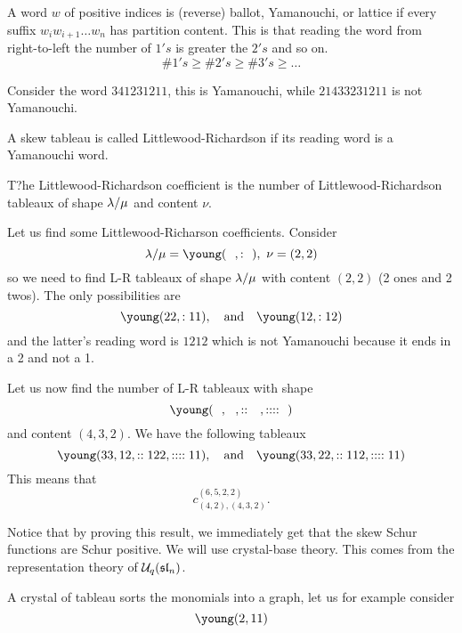 \documentclass[12pt]{memoir}
\begin{document}
\begin{Def}
    A word $w$ of positive indices is (reverse) ballot, Yamanouchi, or lattice if every suffix $w_iw_{i+1}\dots w_n$ has partition content. This is that reading the word from right-to-left the number of $1's$ is greater the $2's$ and so on. 
    $$\#1's\geq\#2's\geq\#3's\geq\dots$$
\end{Def}

\begin{Ex}
    Consider the word $341231211$, this is Yamanouchi, while $21433231211$ is not Yamanouchi.
\end{Ex}

\begin{Def}
    A skew tableau is called Littlewood-Richardson if its reading word is a Yamanouchi word.
\end{Def}

\begin{Th}
    T?he Littlewood-Richardson coefficient is the number of Littlewood-Richardson tableaux of shape $\lambda/\mu$ and content $\nu$.
\end{Th}

\begin{Ex}
    Let us find some Littlewood-Richarson coefficients. Consider 
    $$\la/\mu=\young(~~,:~~),\ \nu=(2,2)$$
    so we need to find L-R tableaux of shape $\lambda/\mu$ with content $(2,2)$ (2 ones and 2 twos). The only possibilities are 
    $$\young(22,:11),\word{and}\young(12,:12)$$
    and the latter's reading word is $1212$ which is not Yamanouchi because it ends in a 2 and not a 1.\par 
    Let us now find the number of L-R tableaux with shape 
    $$\young(~~,~~,::~~~,::::~~)$$
    and content $(4,3,2)$. We have the following tableaux
    $$\young(33,12,::122,::::11),\word{and}\young(33,22,::112,::::11)$$
    This means that 
    $$c^{(6,5,2,2)}_{(4,2),(4,3,2)}.$$
\end{Ex}

Notice that by proving this result, we immediately get that the skew Schur functions are Schur positive. We will use crystal-base theory. This comes from the representation theory of $\mathcal{U}_{q}(\mathfrak{sl}_n)$.\par 
A crystal of tableau sorts the monomials into a graph, let us for example consider 
$$\young(2,11)$$
\ifx\nextra\undefined
\printindex
\else\fi
\nocite{*}


\end{document}
